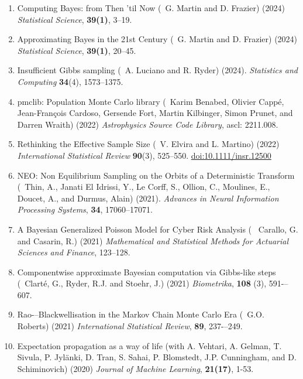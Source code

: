 \begin{enumerate}
\item Computing Bayes: from Then 'til Now (\avec~G. Martin and D. Frazier) (2024)
{\em Statistical Science}, {\bf 39(1)}, 3--19.

\item Approximating Bayes in the 21st Century (\avec~G. Martin and D. Frazier) (2024)
{\em Statistical Science}, {\bf 39(1)}, 20--45.

\item Insufficient Gibbs sampling (\avec~A. Luciano and R. Ryder) (2024).
{\em Statistics and Computing} {\bf 34}(4), 1573--1375.

\item pmclib: Population Monte Carlo library
(\avec~Karim Benabed, Olivier Cappé, Jean-François Cardoso, Gersende Fort, Martin Kilbinger, Simon Prunet, and Darren Wraith) (2022)
{\em Astrophysics Source Code Library}, ascl: 2211.008.

\item Rethinking the Effective Sample Size
(\avec~V. Elvira and L. Martino) (2022)
{\em International Statistical Review} {\bf 90}(3), 525--550.
\href{https://doi.org/10.1111/insr.12500}{doi:10.1111/insr.12500}

\item NEO: Non Equilibrium Sampling on the Orbits of a Deterministic Transform
(\avec~Thin, A.,  Janati El Idrissi, Y., Le Corff, S., Ollion, C., Moulines, E., Doucet, A., and Durmus, Alain) (2021).
{\it Advances in Neural Information Processing Systems}, {\bf 34}, 17060--17071.

\item A Bayesian Generalized Poisson Model for Cyber Risk Analysis (\avec~ Carallo, G. and Casarin, R.) (2021) 
{\em Mathematical and Statistical Methods for Actuarial Sciences and Finance}, 123--128.

\item Componentwise approximate Bayesian computation via Gibbs-like steps
(\avec~Clarté, G., Ryder, R.J. and Stoehr, J.) (2021) {\em Biometrika}, {\bf 108} (3), 591-–607.
 
\item Rao-–Blackwellisation in the Markov Chain Monte Carlo Era (\avec~G.O. Roberts) (2021) {\em International Statistical Review}, {\bf 89}, 237-–249.

\item Expectation propagation as a way of life (with A. Vehtari, A. Gelman, T.
Sivula, P. Jyl\"anki, D. Tran, S. Sahai, P. Blomstedt, J.P. Cunningham, and D.
Schiminovich) (2020) {\em Journal of Machine Learning}, {\bf 21(17)}, 1-53.


\end{enumerate}
